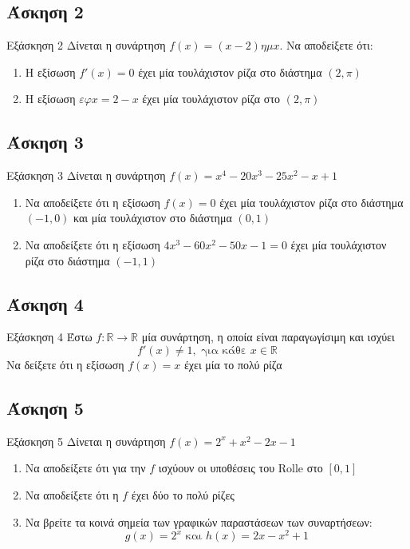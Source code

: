 \documentclass[greek]{beamer}
\begin{document}
\subsection{Άσκηση 2}
\begin{frame}[label=Άσκηση2]{Εξάσκηση 2}
  Δίνεται η συνάρτηση $f(x)=(x-2)ημx$. Να αποδείξετε ότι:
  \begin{enumerate}
    \item<1-> Η εξίσωση $f'(x)=0$ έχει μία τουλάχιστον ρίζα στο διάστημα $(2,π)$
    \item<2-> Η εξίσωση $εφx=2-x$ έχει μία τουλάχιστον ρίζα στο $(2,π)$
  \end{enumerate}

\end{frame}

\subsection{Άσκηση 3}
\begin{frame}[label=Άσκηση3]{Εξάσκηση 3}
  Δίνεται η συνάρτηση $f(x)=x^4-20x^3-25x^2-x+1$
  \begin{enumerate}
    \item<1-> Να αποδείξετε ότι η εξίσωση $f(x)=0$ έχει μία τουλάχιστον ρίζα στο διάστημα $(-1,0)$ και μία τουλάχιστον στο διάστημα $(0,1)$
    \item<2-> Να αποδείξετε ότι η εξίσωση $4x^3-60x^2-50x-1=0$ έχει μία τουλάχιστον ρίζα στο διάστημα $(-1,1)$
  \end{enumerate}
\end{frame}

\subsection{Άσκηση 4}
\begin{frame}[label=Άσκηση4]{Εξάσκηση 4}
  Έστω $f:\mathbb{R}\to\mathbb{R}$ μία συνάρτηση, η οποία είναι παραγωγίσιμη και ισχύει
  $$f'(x)\ne 1, \text{ για κάθε } x\in\mathbb{R}$$
  Να δείξετε ότι η εξίσωση $f(x)=x$ έχει μία το πολύ ρίζα
\end{frame}

\subsection{Άσκηση 5}
\begin{frame}[label=Άσκηση5]{Εξάσκηση 5}
  Δίνεται η συνάρτηση $f(x)=2^x+x^2-2x-1$
  \begin{enumerate}
    \item<1-> Να αποδείξετε ότι για την $f$ ισχύουν οι υποθέσεις του Rolle στο $[0,1]$
    \item<2-> Να αποδείξετε ότι η $f$ έχει δύο το πολύ ρίζες
    \item<3-> Να βρείτε τα κοινά σημεία των γραφικών παραστάσεων των συναρτήσεων:
      $$g(x)=2^x \text{ και } h(x)=2x-x^2+1$$
  \end{enumerate}
\end{frame}
\end{document}
